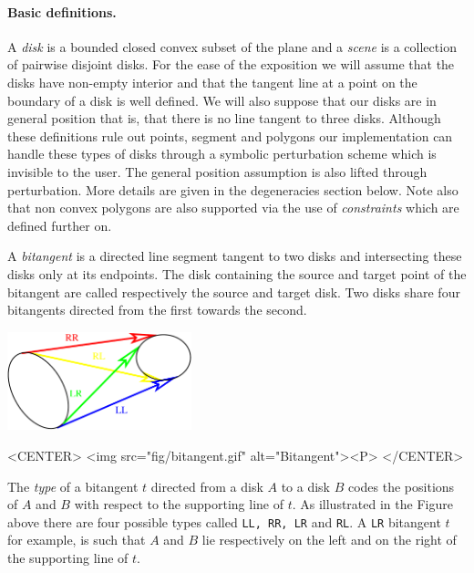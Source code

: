 \paragraph{Basic definitions.}
A \emph{disk} is a bounded closed convex subset of the plane and a
\emph{scene} is a collection of pairwise disjoint disks. For the ease of
the exposition we will assume that the disks have non-empty interior and
that the tangent line at a point on the boundary of a disk is well
defined. We will also suppose that our disks are in general position that
is, that there is no line tangent to three disks. Although these
definitions rule out points, segment and polygons our implementation can
handle these types of disks through a symbolic perturbation scheme which is
invisible to the user.  The general position assumption is also lifted
through perturbation.  More details are given in the degeneracies section
below. Note also that non convex polygons are also supported via the use of
\emph{constraints} which are defined further on.

A \emph{bitangent} is a directed line segment tangent to two disks and
intersecting these disks only at its endpoints.  The disk containing the
source and target point of the bitangent are called respectively the source
and target disk.  Two disks share four bitangents directed from the first
towards the second.

\begin{ccTexOnly}
    \begin{center}
      \parbox{0.4\textwidth}{%
          \includegraphics[width=0.4\textwidth]{Visibility_complex/fig/bitangent}%
      }
    \end{center}
\end{ccTexOnly}

\begin{ccHtmlOnly}
    <CENTER>
        <img src="fig/bitangent.gif" alt="Bitangent"><P>
    </CENTER>
\end{ccHtmlOnly}

\label{VC2-bit-type}
The \emph{type} of a bitangent $t$ directed from a disk $A$ to a disk $B$
codes the positions of $A$ and $B$ with respect to the supporting line of
$t$. As illustrated in the Figure above there are four possible types
called \texttt{LL, RR, LR} and \texttt{RL}. A \texttt{LR} bitangent $t$ for
example, is such that $A$ and $B$ lie respectively on the left and on the
right of the supporting line of $t$.

